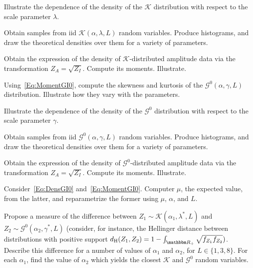 \begin{exer}
Illustrate the dependence of the density of the $\mathcal K$ distribution with respect to the scale parameter $\lambda$.
\end{exer}

\begin{exer}
Obtain samples from iid $\mathcal{K}(\alpha,\lambda,L)$ random variables.
Produce histograms, and draw the theoretical densities over them for a variety of parameters.
\end{exer}

\begin{exer}
Obtain the expression of the density of $\mathcal K$-distributed amplitude data via the transformation $Z_A=\sqrt{Z_I}$.
Compute its moments.
Illustrate.
\end{exer}

\begin{exer}
Using~\eqref{Eq:MomentGI0}, compute the skewness and kurtosis of the $\mathcal G^0(\alpha,\gamma,L)$ distribution.
Illustrate how they vary with the parameters.
\end{exer}

\begin{exer}
Illustrate the dependence of the density of the $\mathcal G^0$ distribution with respect to the scale parameter $\gamma$.
\end{exer}

\begin{exer}
Obtain samples from iid $\mathcal{G}^0(\alpha,\gamma,L)$ random variables.
Produce histograms, and draw the theoretical densities over them for a variety of parameters.
\end{exer}

\begin{exer}
Obtain the expression of the density of $\mathcal G^0$-distributed amplitude data via the transformation $Z_A=\sqrt{Z_I}$.
Compute its moments.
Illustrate.
\end{exer}

\begin{exer}
Consider~\eqref{Eq:DensGI0} and~\eqref{Eq:MomentGI0}.
Computer $\mu$, the expected value, from the latter, and reparametrize the former using $\mu$, $\alpha$, and $L$.
\end{exer}

\begin{exer}\label{Ex:ApproximationKGI0}
Propose a measure of the difference between $Z_1\sim\mathcal K(\alpha_1,\lambda^*, L)$ and $Z_2\sim\mathcal G^0(\alpha_2,\gamma^*, L)$ (consider, for instance, the Hellinger distance between distributions with positive support $d_{\text{H}}(Z_1,Z_2)=1-\int_{\mathbbm R_+}\sqrt{f_{Z_1} f_{Z_2}})$.
Describe this difference for a number of values of $\alpha_1$ and $\alpha_2$, for $L\in\{1,3,8\}$.
For each $\alpha_1$, find the value of $\alpha_2$ which yields the closest $\mathcal K$ and $\mathcal G^0$ random variables\cite{mejailfreryjacobobustos2001}.
\end{exer}
